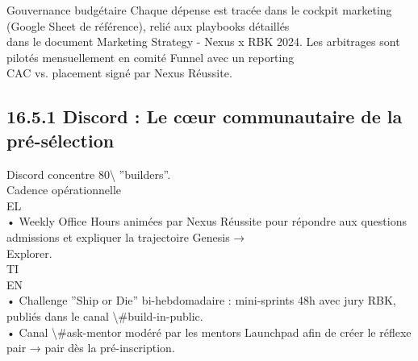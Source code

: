 \documentclass[12pt,landscape,a4paper]{article}
\begin{document}
\vspace{0.5em}
\vspace{0.5em}
Gouvernance budgétaire Chaque dépense est tracée dans le cockpit marketing (Google Sheet de référence), relié aux playbooks détaillés\\
dans le document Marketing Strategy - Nexus x RBK 2024. Les arbitrages sont pilotés mensuellement en comité Funnel avec un reporting\\
CAC vs. placement signé par Nexus Réussite.\\
\vspace{0.5em}
\vspace{0.5em}
\subsection{16.5.1 Discord : Le cœur communautaire de la pré-sélection}
Discord concentre 80\textbackslash{}%
”builders”.\\
\vspace{0.5em}
Cadence opérationnelle\\
\vspace{0.5em}
\vspace{0.5em}
\vspace{0.5em}
\vspace{0.5em}
EL\\
• Weekly Office Hours animées par Nexus Réussite pour répondre aux questions admissions et expliquer la trajectoire Genesis →\\
Explorer.\\
\vspace{0.5em}
\vspace{0.5em}
\vspace{0.5em}
\vspace{0.5em}
TI\\
EN\\
• Challenge ”Ship or Die” bi-hebdomadaire : mini-sprints 48h avec jury RBK, publiés dans le canal \textbackslash{}#build-in-public.\\
\vspace{0.5em}
• Canal \textbackslash{}#ask-mentor modéré par les mentors Launchpad afin de créer le réflexe pair → pair dès la pré-inscription.\\
\vspace{0.5em}
\vspace{0.5em}
\vspace{0.5em}
\end{document}
